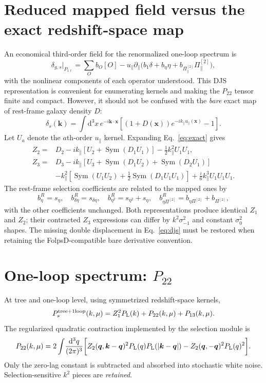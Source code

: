 \documentclass[11pt,a4paper]{article}
\newcommand{\dd}{\mathrm d}
\newcommand{\intq}{\int\!\frac{\dd^3 q}{(2\pi)^3}}
\newcommand{\Pl}{P_{\rm L}}
\newcommand{\bk}{\bm k}
\newcommand{\bq}{\bm q}
\newcommand{\sigs}{\sigma_{-1}^2}
\newcommand{\sym}{\operatorname{Sym}}
\begin{document}
\section{Reduced mapped field versus the exact redshift-space map}
An economical third-order field for the renormalized one-loop spectrum is
\begin{equation}\label{eq:djs}
 \delta_{g,s}\big|_{P_{1\ell}}=\sum_O b_O[O]
 -u_\parallel\partial_\parallel\bigl(b_1\delta+b_\eta\eta+b_{\Pi^{[2]}_\parallel}\Pi^{[2]}_\parallel\bigr),
\end{equation}
with the nonlinear components of each operator understood. This DJS representation is convenient for enumerating kernels and making the $P_{22}$ tensor finite and compact. However, it should not be confused with the \emph{bare} exact map of rest-frame galaxy density $D$:
\begin{equation}\label{eq:exact}
 \delta_s(\bk)=\int \dd^3x\,e^{-i\bk\cdot\bm x}\left[(1+D(\bm x))e^{-ik_\parallel u_\parallel(\bm x)}-1\right].
\end{equation}
Let $U_a$ denote the $a$th-order $u_\parallel$ kernel. Expanding Eq.~\eqref{eq:exact} gives
\begin{align}
 Z_2={}&D_2-ik_\parallel[U_2+\sym(D_1U_1)]-\frac12k_\parallel^2U_1U_1,\\
 Z_3={}&D_3-ik_\parallel[U_3+\sym(D_1U_2)+\sym(D_2U_1)]\\
 &-k_\parallel^2[\sym(U_1U_2)+\tfrac12\sym(D_1U_1U_1)]+\frac{i}{6}k_\parallel^3U_1U_1U_1.
\end{align}
The rest-frame selection coefficients are related to the mapped ones by
\begin{equation}
 b^R_\eta=s_\eta,\quad b^R_{\delta\eta}=s_{\delta\eta},\quad
 b^R_{\eta^2}=s_{\eta^2}+s_\eta,\quad
 b^R_{\eta\Pi^{[2]}}=b_{\eta\Pi^{[2]}}+b_{\Pi^{[2]}},
\end{equation}
with the other coefficients unchanged. Both representations produce identical $Z_1$ and $Z_2$; their contracted $Z_3$ expressions can differ by $k^2\sigs$ and constant $\sigma_0^2$ shapes. The missing double displacement in Eq.~\eqref{eq:djs} must be restored when retaining the FolpsD-compatible bare derivative convention.

\section{One-loop spectrum: $P_{22}$}
At tree and one-loop level, using symmetrized redshift-space kernels,
\begin{equation}\label{eq:loopdecomp}
 P_s^{\mathrm{tree+1loop}}(k,\mu)=Z_1^2\Pl(k)+P_{22}(k,\mu)+P_{13}(k,\mu).
\end{equation}
The regularized quadratic contraction implemented by the selection module is
\begin{equation}\label{eq:p22}
 P_{22}(k,\mu)=2\intq\bigg[Z_2(\bq,\bk-\bq)^2\Pl(q)\Pl(|\bk-\bq|)
 -Z_2(\bq,-\bq)^2\Pl(q)^2\bigg].
\end{equation}
Only the zero-lag constant is subtracted and absorbed into stochastic white noise. Selection-sensitive $k^2$ pieces are \emph{retained}.
\end{document}
